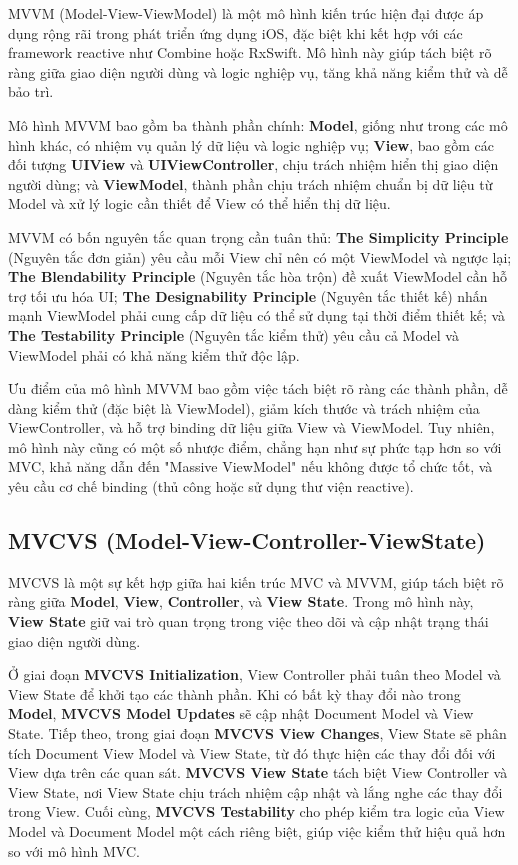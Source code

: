 \hspace*{0.8cm}MVVM (Model-View-ViewModel) là một mô hình kiến trúc hiện đại được áp dụng rộng rãi trong phát triển ứng dụng iOS, đặc biệt khi kết hợp với các framework reactive như Combine hoặc RxSwift. Mô hình này giúp tách biệt rõ ràng giữa giao diện người dùng và logic nghiệp vụ, tăng khả năng kiểm thử và dễ bảo trì.

  Mô hình MVVM bao gồm ba thành phần chính: \textbf{Model}, giống như trong các mô hình khác, có nhiệm vụ quản lý dữ liệu và logic nghiệp vụ; \textbf{View}, bao gồm các đối tượng \textbf{UIView} và \textbf{UIViewController}, chịu trách nhiệm hiển thị giao diện người dùng; và \textbf{ViewModel}, thành phần chịu trách nhiệm chuẩn bị dữ liệu từ Model và xử lý logic cần thiết để View có thể hiển thị dữ liệu.

  MVVM có bốn nguyên tắc quan trọng cần tuân thủ: \textbf{The Simplicity Principle} (Nguyên tắc đơn giản) yêu cầu mỗi View chỉ nên có một ViewModel và ngược lại; \textbf{The Blendability Principle} (Nguyên tắc hòa trộn) đề xuất ViewModel cần hỗ trợ tối ưu hóa UI; \textbf{The Designability Principle} (Nguyên tắc thiết kế) nhấn mạnh ViewModel phải cung cấp dữ liệu có thể sử dụng tại thời điểm thiết kế; và \textbf{The Testability Principle} (Nguyên tắc kiểm thử) yêu cầu cả Model và ViewModel phải có khả năng kiểm thử độc lập.

  Ưu điểm của mô hình MVVM bao gồm việc tách biệt rõ ràng các thành phần, dễ dàng kiểm thử (đặc biệt là ViewModel), giảm kích thước và trách nhiệm của ViewController, và hỗ trợ binding dữ liệu giữa View và ViewModel. Tuy nhiên, mô hình này cũng có một số nhược điểm, chẳng hạn như sự phức tạp hơn so với MVC, khả năng dẫn đến "Massive ViewModel" nếu không được tổ chức tốt, và yêu cầu cơ chế binding (thủ công hoặc sử dụng thư viện reactive).

  \subsection{MVCVS (Model-View-Controller-ViewState)}

\hspace*{0.8cm}MVCVS là một sự kết hợp giữa hai kiến trúc MVC và MVVM, giúp tách biệt rõ ràng giữa \textbf{Model}, \textbf{View}, \textbf{Controller}, và \textbf{View State}. Trong mô hình này, \textbf{View State} giữ vai trò quan trọng trong việc theo dõi và cập nhật trạng thái giao diện người dùng.

  Ở giai đoạn \textbf{MVCVS Initialization}, View Controller phải tuân theo Model và View State để khởi tạo các thành phần. Khi có bất kỳ thay đổi nào trong \textbf{Model}, \textbf{MVCVS Model Updates} sẽ cập nhật Document Model và View State. Tiếp theo, trong giai đoạn \textbf{MVCVS View Changes}, View State sẽ phân tích Document View Model và View State, từ đó thực hiện các thay đổi đối với View dựa trên các quan sát. \textbf{MVCVS View State} tách biệt View Controller và View State, nơi View State chịu trách nhiệm cập nhật và lắng nghe các thay đổi trong View. Cuối cùng, \textbf{MVCVS Testability} cho phép kiểm tra logic của View Model và Document Model một cách riêng biệt, giúp việc kiểm thử hiệu quả hơn so với mô hình MVC.

